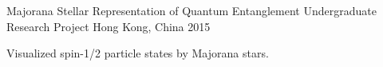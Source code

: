 \begin{cventries}
  \cventry
    {Majorana Stellar Representation of Quantum Entanglement} %
    {Undergraduate Research Project} %
    {Hong Kong, China} %
    {2015} %
    {
      \begin{cvitems} %
        \item {Visualized spin-1/2 particle states by Majorana stars.}
      \end{cvitems}
    }

\end{cventries}
